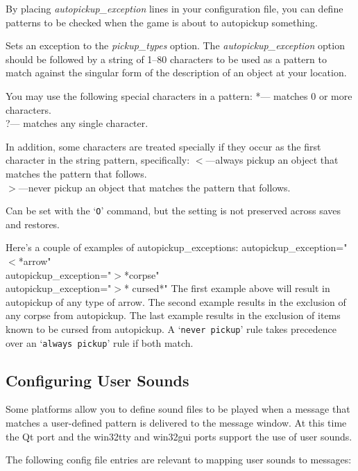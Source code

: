 By placing 
{\it autopickup_exception\/} 
lines in your configuration
file, you can define patterns to be checked when the game is about to
autopickup something.
\blist{}

\item[\ib{autopickup\_exception}]
Sets an exception to the 
{\it pickup_types\/} 
option.
The
{\it autopickup_exception\/} 
option should be followed by a string of 1--80 characters to be used as a 
pattern to match against the singular form of the description of an 
object at your location.
\elist
\nd %

You may use the following special characters in a pattern:
  *--- matches 0 or more characters.\\
  ?--- matches any single character.

In addition, some characters are treated specially if they occur as the first 
character in the string pattern, specifically:
$<$---always pickup an object that matches the pattern that follows.\\
$>$---never pickup an object that matches the pattern that follows.

Can be set with the `{\tt O}' command, but the setting is not preserved
across saves and restores.

Here's a couple of examples of autopickup\_exceptions:
autopickup\_exception="$<$*arrow"\\
autopickup\_exception="$>$*corpse"\\
autopickup\_exception="$>$* cursed*"
The first example above will result in autopickup of any type of arrow.
The second example results in the exclusion of any corpse from autopickup.
The last example results in the exclusion of items known to be cursed from autopickup.
A `{\tt never pickup}' rule takes precedence over an `{\tt always pickup}' rule if both match.
\subsection*{Configuring User Sounds}


Some platforms allow you to define sound files to be played when a message 
that matches a user-defined pattern is delivered to the message window.
At this time the Qt port and the win32tty and win32gui ports support the
use of user sounds.

The following config file entries are relevant to mapping user sounds
to messages:
\blist{}


